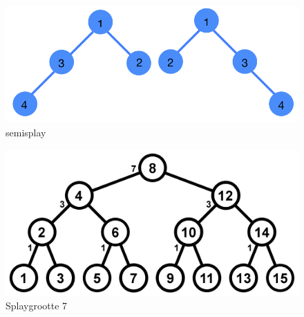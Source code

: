 \documentclass[dutch, 11pt]{report}
\begin{document}
\begin{figure}[h]
\caption{semisplay}
\includegraphics[scale=0.2, width=\textwidth]{4_Toppen_Semi}
\centering
\end{figure}

\begin{figure}[h]
\caption{Splaygrootte 7}
\includegraphics[scale=0.2, width=\textwidth]{Vraag2_C}
\centering
\end{figure}
\end{document}
